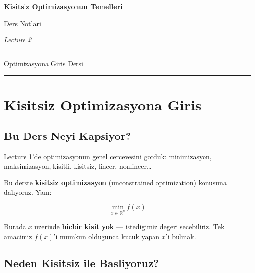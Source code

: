 \documentclass[12pt,a4paper]{article}
\theoremstyle{definition}
\theoremstyle{remark}
\begin{document}
\begin{titlepage}
\centering
\vspace*{3cm}

{\Huge\bfseries Kisitsiz Optimizasyonun Temelleri\par}
\vspace{0.8cm}
{\LARGE Ders Notlari\par}
\vspace{1.5cm}
{\Large\itshape Lecture 2\par}
\vspace{3cm}

\hrule
\vspace{0.5cm}
{\large Optimizasyona Giris Dersi\par}
\vspace{0.5cm}
\hrule

\vfill
\end{titlepage}

\tableofcontents
\newpage

\section{Kisitsiz Optimizasyona Giris}

\subsection{Bu Ders Neyi Kapsiyor?}

Lecture 1'de optimizasyonun genel cercevesini gorduk: minimizasyon, maksimizasyon, kisitli, kisitsiz, lineer, nonlineer\ldots

Bu derste \textbf{kisitsiz optimizasyon} (unconstrained optimization) konusuna daliyoruz. Yani:

\[
\min_{x \in \mathbb{R}^n} f(x)
\]

Burada $x$ uzerinde \textbf{hicbir kisit yok} --- istedigimiz degeri secebiliriz. Tek amacimiz $f(x)$'i mumkun oldugunca kucuk yapan $x$'i bulmak.

\subsection{Neden Kisitsiz ile Basliyoruz?}
\end{document}
